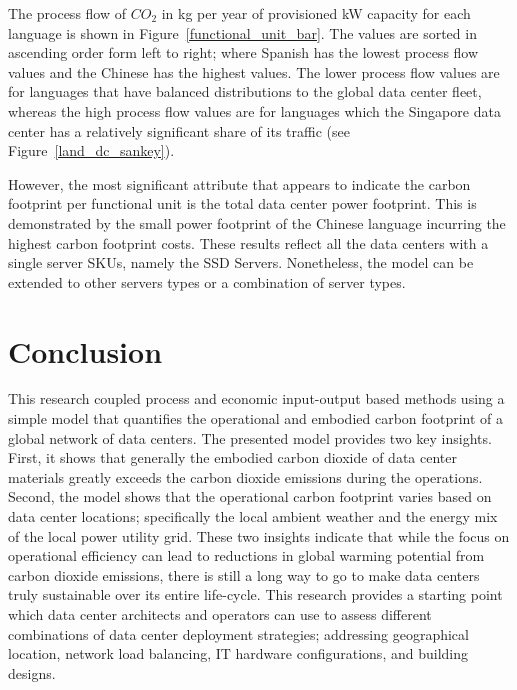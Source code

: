     The process flow of $CO_2$ in kg per year of provisioned kW capacity for each language is shown in Figure~\ref{functional_unit_bar}. The values are sorted in ascending order form left to right; where Spanish has the lowest process flow values and the Chinese has the highest values. The lower process flow values are for languages that have balanced distributions to the global data center fleet, whereas the high process flow values are for languages which the Singapore data center has a relatively significant share of its traffic (see Figure~\ref{land_dc_sankey}). 
    
    However, the most significant attribute that appears to indicate the carbon footprint per functional unit is the total data center power footprint. This is demonstrated by the small power footprint of the Chinese language incurring the highest carbon footprint costs. These results reflect all the data centers with a single server SKUs, namely the SSD Servers. Nonetheless, the model can be extended to other servers types or a combination of server types.
    
    
    
\section{Conclusion}

This research coupled process and economic input-output based methods using a simple model that quantifies the operational and embodied carbon footprint of a global network of data centers.  The presented model provides two key insights. First, it shows that generally the embodied carbon dioxide of data center materials greatly exceeds the carbon dioxide emissions during the operations. Second, the model shows that the operational carbon footprint varies based on data center locations; specifically the local ambient weather and the energy mix of the local power utility grid. These two insights indicate that while the focus on operational efficiency can lead to reductions in global warming potential from carbon dioxide emissions, there is still a long way to go to make data centers truly sustainable over its entire life-cycle. This research provides a starting point which data center architects and operators can use to assess different combinations of data center deployment strategies; addressing geographical location, network load balancing, IT hardware configurations, and building designs.



        